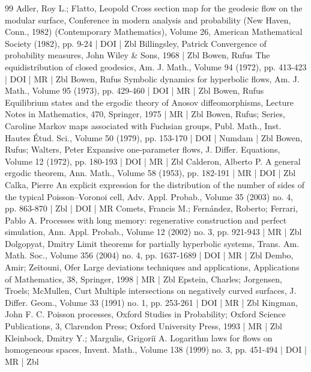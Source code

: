 \begin{thebibliography}{99}
Adler, Roy L.; Flatto, Leopold Cross section map for the geodesic flow on the modular surface, Conference in modern analysis and probability (New Haven, Conn., 1982) (Contemporary Mathematics), Volume 26, American Mathematical Society (1982), pp. 9-24 | DOI | Zbl
Billingsley, Patrick Convergence of probability measures, John Wiley \& Sons, 1968 | Zbl
Bowen, Rufus The equidistribution of closed geodesics, Am. J. Math., Volume 94 (1972), pp. 413-423 | DOI | MR | Zbl
Bowen, Rufus Symbolic dynamics for hyperbolic flows, Am. J. Math., Volume 95 (1973), pp. 429-460 | DOI | MR | Zbl
Bowen, Rufus Equilibrium states and the ergodic theory of Anosov diffeomorphisms, Lecture Notes in Mathematics, 470, Springer, 1975 | MR | Zbl
Bowen, Rufus; Series, Caroline Markov maps associated with Fuchsian groups, Publ. Math., Inst. Hautes Étud. Sci., Volume 50 (1979), pp. 153-170 | DOI | Numdam | Zbl
Bowen, Rufus; Walters, Peter Expansive one-parameter flows, J. Differ. Equations, Volume 12 (1972), pp. 180-193 | DOI | MR | Zbl
Calderon, Alberto P. A general ergodic theorem, Ann. Math., Volume 58 (1953), pp. 182-191 | MR | DOI | Zbl
Calka, Pierre An explicit expression for the distribution of the number of sides of the typical Poisson–Voronoi cell, Adv. Appl. Probab., Volume 35 (2003) no. 4, pp. 863-870 | Zbl | DOI | MR
Comets, Francis M.; Fernández, Roberto; Ferrari, Pablo A. Processes with long memory: regenerative construction and perfect simulation, Ann. Appl. Probab., Volume 12 (2002) no. 3, pp. 921-943 | MR | Zbl
Dolgopyat, Dmitry Limit theorems for partially hyperbolic systems, Trans. Am. Math. Soc., Volume 356 (2004) no. 4, pp. 1637-1689 | DOI | MR | Zbl
Dembo, Amir; Zeitouni, Ofer Large deviations techniques and applications, Applications of Mathematics, 38, Springer, 1998 | MR | Zbl
Epstein, Charles; Jorgensen, Troels; McMullen, Curt Multiple intersections on negatively curved surfaces, J. Differ. Geom., Volume 33 (1991) no. 1, pp. 253-261 | DOI | MR | Zbl
Kingman, John F. C. Poisson processes, Oxford Studies in Probability; Oxford Science Publications, 3, Clarendon Press; Oxford University Press, 1993 | MR | Zbl
Kleinbock, Dmitry Y.; Margulis, Grigoriĭ A. Logarithm laws for flows on homogeneous spaces, Invent. Math., Volume 138 (1999) no. 3, pp. 451-494 | DOI | MR | Zbl

\end{thebibliography}
